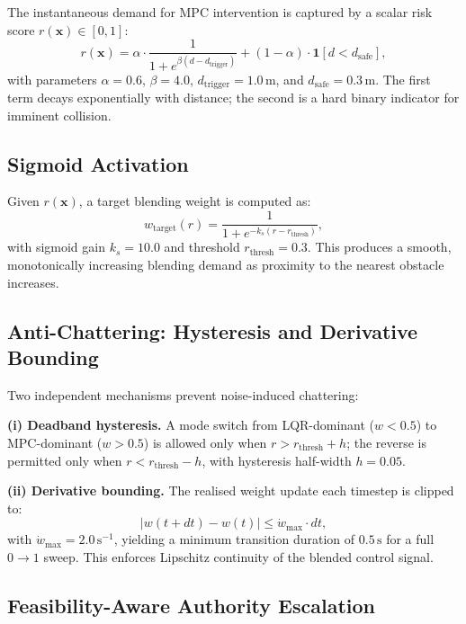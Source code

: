 \documentclass[journal]{IEEEtran}
\begin{document}
The instantaneous demand for MPC intervention is captured by a scalar risk
score \(r(\mathbf{x}) \in [0,1]\):
\begin{equation}\label{eq:risk}
  r(\mathbf{x}) =
    \alpha \cdot \frac{1}{1+e^{\beta(d - d_{\mathrm{trigger}})}} +
    (1-\alpha) \cdot \mathbf{1}[d < d_{\mathrm{safe}}],
\end{equation}
with parameters \(\alpha=0.6\), \(\beta=4.0\), \(d_{\mathrm{trigger}}=1.0\,\text{m}\),
and \(d_{\mathrm{safe}}=0.3\,\text{m}\).
The first term decays exponentially with distance; the second is a hard binary
indicator for imminent collision.

\subsection{Sigmoid Activation}

Given \(r(\mathbf{x})\), a target blending weight is computed as:
\begin{equation}\label{eq:sigmoid}
  w_{\mathrm{target}}(r) =
    \frac{1}{1 + e^{-k_s(r - r_{\mathrm{thresh}})}},
\end{equation}
with sigmoid gain \(k_s = 10.0\) and threshold \(r_{\mathrm{thresh}} = 0.3\).
This produces a smooth, monotonically increasing blending demand as proximity
to the nearest obstacle increases.

\subsection{Anti-Chattering: Hysteresis and Derivative Bounding}

Two independent mechanisms prevent noise-induced chattering:

\textbf{(i) Deadband hysteresis.}
A mode switch from LQR-dominant (\(w < 0.5\)) to MPC-dominant (\(w > 0.5\)) is
allowed only when \(r > r_{\mathrm{thresh}} + h\); the reverse is permitted only
when \(r < r_{\mathrm{thresh}} - h\), with hysteresis half-width \(h=0.05\).

\textbf{(ii) Derivative bounding.}
The realised weight update each timestep is clipped to:
\begin{equation}\label{eq:deriv_bound}
  |w(t+dt) - w(t)| \leq \dot{w}_{\max} \cdot dt,
\end{equation}
with \(\dot{w}_{\max} = 2.0\,\text{s}^{-1}\), yielding a minimum transition
duration of \(0.5\,\text{s}\) for a full \(0 \to 1\) sweep.
This enforces Lipschitz continuity of the blended control signal.

\subsection{Feasibility-Aware Authority Escalation}
\end{document}
